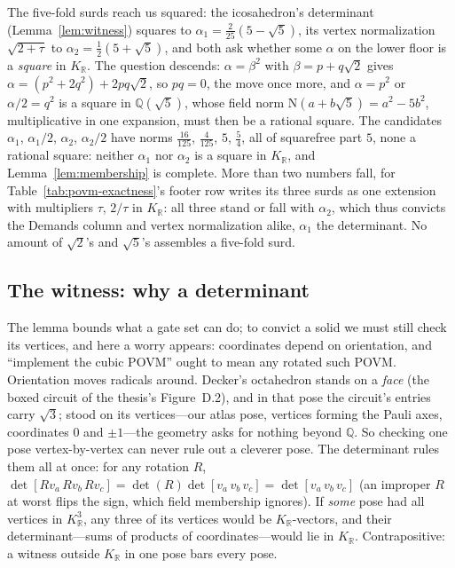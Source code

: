 \documentclass[11pt,a4paper]{article}
\newcommand{\R}{\mathbb{R}}
\newcommand{\phig}{\tau}      %
\begin{document}
The five-fold surds reach us squared: the icosahedron's determinant (Lemma~\ref{lem:witness}) squares to $\alpha_1 = \tfrac{2}{25}(5-\sqrt{5})$, its vertex normalization $\sqrt{2+\phig}$ to $\alpha_2 = \tfrac{1}{2}(5+\sqrt{5})$, and both ask whether some $\alpha$ on the lower floor is a \textit{square} in $K_\R$. The question descends: $\alpha = \beta^2$ with $\beta = p + q\sqrt{2}$ gives $\alpha = (p^2 + 2q^2) + 2pq\sqrt{2}$, so $pq = 0$, the move once more, and $\alpha = p^2$ or $\alpha/2 = q^2$ is a square in $\mathbb{Q}(\sqrt{5})$, whose field norm $\mathrm{N}(a + b\sqrt{5}) = a^2 - 5b^2$, multiplicative in one expansion, must then be a rational square. The candidates $\alpha_1$, $\alpha_1/2$, $\alpha_2$, $\alpha_2/2$ have norms $\tfrac{16}{125}$, $\tfrac{4}{125}$, $5$, $\tfrac{5}{4}$, all of squarefree part $5$, none a rational square: neither $\alpha_1$ nor $\alpha_2$ is a square in $K_\R$, and Lemma~\ref{lem:membership} is complete. More than two numbers fall, for Table~\ref{tab:povm-exactness}'s footer row writes its three surds as one extension with multipliers $\phig$, $2/\phig$ in $K_\R$: all three stand or fall with $\alpha_2$, which thus convicts the Demands column and vertex normalization alike, $\alpha_1$ the determinant. No amount of $\sqrt{2}$'s and $\sqrt{5}$'s assembles a five-fold surd.

\subsection{The witness: why a determinant}

The lemma bounds what a gate set can do; to convict a solid we must still check its vertices, and here a worry appears: coordinates depend on orientation, and ``implement the cubic POVM'' ought to mean any rotated such POVM. Orientation moves radicals around. Decker's octahedron stands on a \textit{face} (the boxed circuit of the thesis's Figure~D.2), and in that pose the circuit's entries carry $\sqrt{3}$; stood on its vertices---our atlas pose, vertices forming the Pauli axes, coordinates $0$ and $\pm 1$---the geometry asks for nothing beyond $\mathbb{Q}$. So checking one pose vertex-by-vertex can never rule out a cleverer pose. The determinant rules them all at once: for any rotation $R$, $\det[Rv_a\,Rv_b\,Rv_c] = \det(R)\det[v_a\,v_b\,v_c] = \det[v_a\,v_b\,v_c]$ (an improper $R$ at worst flips the sign, which field membership ignores). If \textit{some} pose had all vertices in $K_\R^3$, any three of its vertices would be $K_\R$-vectors, and their determinant---sums of products of coordinates---would lie in $K_\R$. Contrapositive: a witness outside $K_\R$ in one pose bars every pose.
\end{document}
